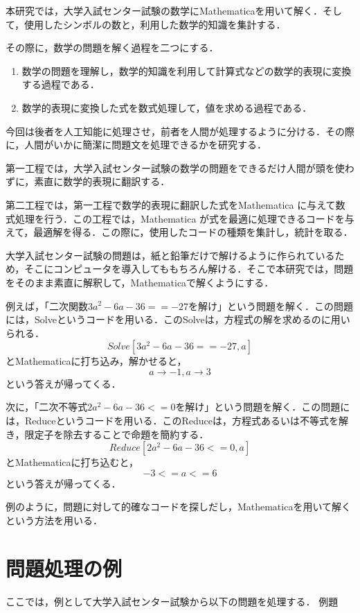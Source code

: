 本研究では，大学入試センター試験の数学にMathematicaを用いて解く．そして，使用したシンボルの数と，利用した数学的知識を集計する．

その際に，数学の問題を解く過程を二つにする．


\begin{enumerate}
\item 数学の問題を理解し，数学的知識を利用して計算式などの数学的表現に変換する過程である．

\item 数学的表現に変換した式を数式処理して，値を求める過程である．
\end{enumerate}

今回は後者を人工知能に処理させ，前者を人間が処理するように分ける．その際に，人間がいかに簡潔に問題文を処理できるかを研究する．

第一工程では，大学入試センター試験の数学の問題をできるだけ人間が頭を使わずに，素直に数学的表現に翻訳する．

第二工程では，第一工程で数学的表現に翻訳した式をMathematica に与えて数式処理を行う．この工程では，Mathematica が式を最適に処理できるコードを与えて，最適解を得る．この際に，使用したコードの種類を集計し，統計を取る．

大学入試センター試験の問題は，紙と鉛筆だけで解けるように作られているため，そこにコンピュータを導入してももちろん解ける．そこで本研究では，問題をそのまま素直に解釈して，Mathematicaで解くようにする．

例えば，「二次関数$3a^2 -6a-36==-27$を解け」という問題を解く．この問題には，Solveというコードを用いる．このSolveは，方程式の解を求めるのに用いられる．\[Solve[3a^2 -6a-36==-27,a]\]とMathematicaに打ち込み，解かせると，\[{{a→-1},{a→3}}\]という答えが帰ってくる．

次に，「二次不等式$2a^2 -6a-36<=0$を解け」という問題を解く．この問題には，Reduceというコードを用いる．このReduceは，方程式あるいは不等式を解き，限定子を除去することで命題を簡約する．\[Reduce[2a^2 -6a-36<=0,a]\]とMathematicaに打ち込むと，\[-3<=a<=6\]という答えが帰ってくる．

例のように，問題に対して的確なコードを探しだし，Mathematicaを用いて解くという方法を用いる．

\clearpage

\section{問題処理の例}

ここでは，例として大学入試センター試験から以下の問題を処理する．
例題

